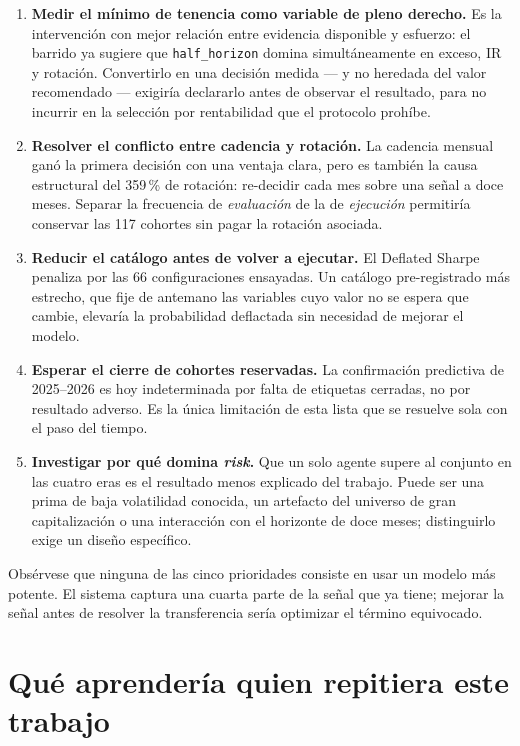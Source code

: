 \begin{enumerate}[leftmargin=*,itemsep=0.4em]
  \item \textbf{Medir el mínimo de tenencia como variable de pleno derecho.} Es la intervención con
  mejor relación entre evidencia disponible y esfuerzo: el barrido ya sugiere que
  \texttt{half\_horizon} domina simultáneamente en exceso, IR y rotación. Convertirlo en una
  decisión medida --- y no heredada del valor recomendado --- exigiría declararlo antes de observar
  el resultado, para no incurrir en la selección por rentabilidad que el protocolo prohíbe.
  \item \textbf{Resolver el conflicto entre cadencia y rotación.} La cadencia mensual ganó la primera
  decisión con una ventaja clara, pero es también la causa estructural del 359\,\% de rotación:
  re-decidir cada mes sobre una señal a doce meses. Separar la frecuencia de \emph{evaluación} de la
  de \emph{ejecución} permitiría conservar las 117 cohortes sin pagar la rotación asociada.
  \item \textbf{Reducir el catálogo antes de volver a ejecutar.} El Deflated Sharpe penaliza por las
  66 configuraciones ensayadas. Un catálogo pre-registrado más estrecho, que fije de antemano las
  variables cuyo valor no se espera que cambie, elevaría la probabilidad deflactada sin necesidad de
  mejorar el modelo.
  \item \textbf{Esperar el cierre de cohortes reservadas.} La confirmación predictiva de 2025--2026
  es hoy indeterminada por falta de etiquetas cerradas, no por resultado adverso. Es la única
  limitación de esta lista que se resuelve sola con el paso del tiempo.
  \item \textbf{Investigar por qué domina \textit{risk}.} Que un solo agente supere al conjunto en
  las cuatro eras es el resultado menos explicado del trabajo. Puede ser una prima de baja
  volatilidad conocida, un artefacto del universo de gran capitalización o una interacción con el
  horizonte de doce meses; distinguirlo exige un diseño específico.
\end{enumerate}

Obsérvese que ninguna de las cinco prioridades consiste en usar un modelo más potente. El sistema
captura una cuarta parte de la señal que ya tiene; mejorar la señal antes de resolver la
transferencia sería optimizar el término equivocado.

\section{Qué aprendería quien repitiera este trabajo}

